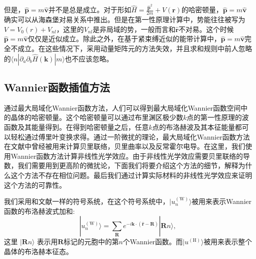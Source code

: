 但是，$\hat{\mathbf{p}}=m\hat{\mathbf{v}}$并不是总是成立。对于形如$\hat{H}=\frac{\hat{\mathbf{p}}^{2}}{2m}+V(\mathbf{r})$的哈密顿量，$\hat{\mathbf{p}}=m\hat{\mathbf{v}}$确实可以从海森堡对易关系中推出。但是在第一性原理计算中，势能往往被写为 $V=V_{0}(r)+V_{nl}$，这里的$V_{nl}$是非局域的势，一般而言和$\hat{\mathbf{r}}$不对易。这个时候$\hat{\mathbf{p}}= m\hat{\mathbf{v}}$仅仅是近似成立。除此之外，在基于紧束缚近似的能带计算中，$\hat{\mathbf{p}}=m\hat{\mathbf{v}}$完全不成立。在这些情况下，采用动量矩阵元的方法失效，并且求和规则中前人\cite{sipe_second-order_2000}忽略的$\langle n|\partial_{a}\partial_{b}\hat{H}(\mathbf{k})|m\rangle$也不应该忽略。


\subsection{Wannier函数插值方法}

通过最大局域化Wannier函数方法，人们可以得到最大局域化Wannier函数空间中的晶体的哈密顿量。这个哈密顿量可以通过布里渊区极少数$k$点的第一性原理的波函数及其能量得到。在得到哈密顿量之后，任意$k$点的布洛赫波及其本征能量都可以轻松通过傅里叶变换求得。通过一阶微扰的理论，最大局域化Wannier函数方法在文献中曾经被用来计算贝里联络，贝里曲率以及反常霍尔电导。在这里，我们使用Wannier函数方法计算非线性光学效应。由于非线性光学效应需要贝里联络的导数，我们需要用到更高阶的微扰论，下面我们将要介绍这个方法的细节，解释为什么这个方法不存在相位问题。最后我们通过计算实际材料的非线性光学效应来证明这个方法的可靠性。

我们采用和文献一样的符号系统，在这个符号系统中，$|u_{n}^{(\textrm{W})}\rangle$被用来表示Wannier函数的布洛赫波式加和: 
\[
|u_{n}^{(\textrm{W})}\rangle=\sum_{\mathbf{R}}e^{-i\mathbf{k}\cdot(\hat{\mathbf{r}}-\mathbf{R})}|\mathbf{R}n\rangle,
\]
这里 $|\mathbf{R}n\rangle$ 表示用$\mathbf{R}$标记的元胞中的第$n$个Wannier函数。而$|u^{(\textrm{H})}\rangle$被用来表示整个晶体的布洛赫本征态。

